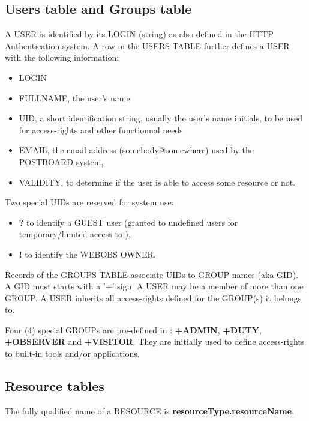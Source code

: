 \subsection{Users table and Groups table}
\label{usertable}

A \webobs USER is identified by its LOGIN (string) as also defined in the HTTP Authentication system. A row in  
the USERS TABLE further defines a USER with the following information: 

\begin{itemize}
\item   LOGIN
\item   FULLNAME, the user's name
\item   UID, a short identification string, usually the user's name initials, to be used for access-rights and other functionnal needs
\item   EMAIL, the email address (somebody@somewhere) used by the \webobs POSTBOARD system,
\item   VALIDITY, to determine if the user is able to access some resource or not.
\end{itemize}

Two special UIDs are reserved for system use: 
\begin{itemize}
\item   \textbf{?} to identify a GUEST user (granted to undefined users for temporary/limited access to \webobs), 
\item   \textbf{!} to identify the WEBOBS OWNER.
\end{itemize}

Records of the GROUPS TABLE associate UIDs to GROUP names (aka GID). A GID must starts with a '+' sign.
A USER may be a member of more than one GROUP. A USER inherits all access-rights defined for the GROUP(s) it belongs to. 

Four (4) special GROUPs are pre-defined in \webobs: \textbf{+ADMIN}, \textbf{+DUTY}, \textbf{+OBSERVER} and \textbf{+VISITOR}. They are initially used to  
define access-rights to \webobs built-in tools and/or applications. 

\subsection{Resource tables}

The fully qualified name of a \webobs RESOURCE is \textbf{resourceType.resourceName}.

